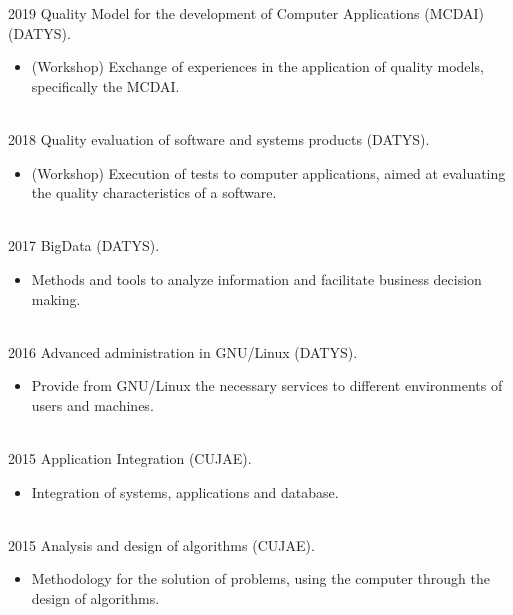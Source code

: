 \documentclass[letterpaper]{twentysecondcv} %
\begin{document}
\begin{twenty} %
\twentyitem
    	{2019}
		{}
        {Quality Model for the development of Computer Applications (MCDAI) (DATYS).}
        {}
        {}
        {
        {\begin{itemize}
        \item (Workshop) Exchange of experiences in the application of quality models, specifically the MCDAI.
		\end{itemize}}
        }
        \\
\twentyitem
    	{2018}
		{}
        {Quality evaluation of software and systems products (DATYS).}
        {}
        {}
        {
        {\begin{itemize}
        \item (Workshop) Execution of tests to computer applications, aimed at evaluating the quality characteristics of a software.
		\end{itemize}}
        }
        \\
\twentyitem
    	{2017}
		{}
        {BigData (DATYS).}
        {}
        {}
        {
        {\begin{itemize}
        \item Methods and tools to analyze information and facilitate business decision making.
		\end{itemize}}
        }
        \\
\twentyitem
    	{2016}
		{}
        {Advanced administration in GNU/Linux (DATYS).}
        {}
        {}
        {
        {\begin{itemize}
        \item Provide from GNU/Linux the necessary services to different environments of users and machines.
		\end{itemize}}
        }
        \\
\twentyitem
    	{2015}
		{}
        {Application Integration (CUJAE).}
        {}
        {}
        {
        {\begin{itemize}
        \item Integration of systems, applications and database.
		\end{itemize}}
        }
        \\
\twentyitem
    	{2015}
		{}
        {Analysis and design of algorithms (CUJAE).}
        {}
        {}
        {
        {\begin{itemize}
        \item Methodology for the solution of problems, using the computer through the design of algorithms.

\end{itemize}}}
\end{twenty}
\end{document}
